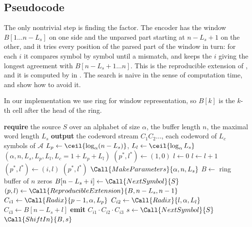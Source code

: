 \subsection{Pseudocode}
The only nontrivial step is finding the factor. The encoder has the window \(B[1\ldots n - L_s]\) on one side and the unparsed part starting at \(n - L_s + 1\) on the other, and it tries every position of the parsed part of the window in turn: for each \(i\) it compares symbol by symbol until a mismatch, and keeps the \(i\) giving the longest agreement with \(B[n - L_s + 1 \ldots n]\). This is the reproducible extension of , and it is computed by  in . The search is naive in the sense of computation time, and  show how to avoid it.

In our implementation we use ring for window representation, so $B[k]$ is the $k$-th cell after the head of the ring.
\begin{algorithm}[H]
\caption{LZ77 encoder with a sliding window}
\label{alg:lz77-encoder}
\begin{algorithmic}[1]
\Statex
\State \textbf{require} the source \(S\) over an alphabet of size \(\alpha\), the buffer length \(n\), the maximal word length \(L_s\)
\State \textbf{output} the codeword stream \(C_1 C_2 \ldots\), each codeword of \(L_c\) symbols of \(\mathcal{A}\)
\Statex
{}
    \State $L_p \gets \ceil{\log_\alpha (n - L_s)}$, 
    \State $L_l \gets \ceil{\log_\alpha L_s}$
    \State \Return $(\alpha, n, L_s, L_p, L_l, L_c = 1 + L_p + L_l)$
\EndFunction
\Statex
{} 
    \State $(p^*, l^*) \gets (1, 0)$
        \State $l \gets 0$
            \State $l \gets l + 1$
        \EndWhile
         
            \State $(p^*, l^*) \gets (i, l)$
        \EndIf
    \EndFor
    \State \Return $(p^*, l^*)$
\EndFunction
\Statex
{}
    \State $\Call{MakeParameters}{\alpha, n, L_s}$
    \State $B \gets$ ring buffer of $n$ zeros
        \State $B[n - L_s + i] \gets \Call{NextSymbol}{S}$
    \EndFor
        \State $(p, l) \gets \Call{ReproducibleExtension}{B, n - L_s, n - 1}$
        \State $C_{i1} \gets \Call{Radix}{p - 1, \alpha, L_p}$
        \State $C_{i2} \gets \Call{Radix}{l, \alpha, L_l}$
        \State $C_{i3} \gets B[n - L_s + l]$
        \State \textbf{emit} $C_{i1} \cdot C_{i2} \cdot C_{i3}$
            \State $s \gets \Call{NextSymbol}{S}$
            \State $\Call{ShiftIn}{B, s}$
        \EndFor
    \EndWhile
\EndProcedure
\end{algorithmic}
\end{algorithm}

